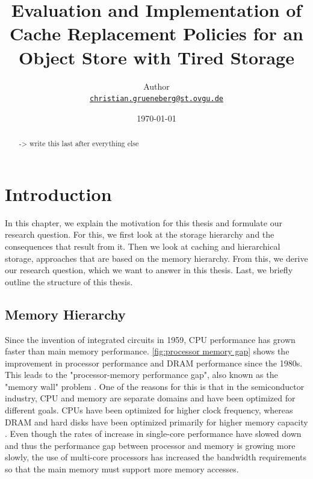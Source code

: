 \documentclass[
	12pt,
	a4paper,
	abstract,
	bibliography=totoc,
	chapterprefix,
	headings=openright,
	numbers=endperiod,
	parskip=half,
	twoside,
]{scrreprt}
\title{Evaluation and Implementation of Cache Replacement Policies for an Object Store with Tired Storage}
\author{
Author\\
{\large\href{mailto:christian.grueneberg@st.ovgu.de}{\nolinkurl{christian.grueneberg@st.ovgu.de}}}
}
\date{\today}
\begin{document}
{}

\maketitle

\begin{abstract}


-> write this last after everything else

\end{abstract}

\tableofcontents

\cleardoubleoddpage
{}

\chapter{Introduction}
\label{cha:introduction}



In this chapter, we explain the motivation for this thesis and formulate our research question.
For this, we first look at the storage hierarchy and the consequences that result from it.
Then we look at caching and hierarchical storage, approaches that are based on the memory hierarchy.
From this, we derive our research question, which we want to answer in this thesis.
Last, we briefly outline the structure of this thesis.

\section{Memory Hierarchy}
Since the invention of integrated circuits in 1959, CPU performance has grown faster than main memory performance.
\cref{fig:processor memory gap} shows the improvement in processor performance and DRAM performance since the 1980s.
This leads to the "processor-memory performance gap", also known as the "memory wall" problem \cite{wulf1995hitting}.
One of the reasons for this is that in the semiconductor industry, CPU and memory are separate domains and have been optimized for different goals.
CPUs have been optimized for higher clock frequency, whereas DRAM and hard disks have been optimized primarily for higher memory capacity \cite{cpu-mem-gap}.
Even though the rates of increase in single-core performance have slowed down and thus the performance gap between processor and memory is growing more slowly, the use of multi-core processors has increased the bandwidth requirements so that the main memory must support more memory accesses.
\end{document}
